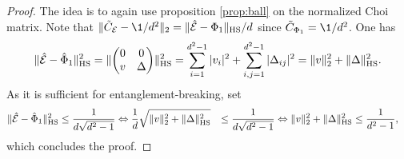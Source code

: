 \begin{proof}
The idea is to again use proposition \ref{prop:ball} on the normalized Choi matrix. Note that $\norm{\tilde C_{\m E} - \1/d^2}_2 = \norm{\hat{\m E}- \Phi_1}_\text{HS}/d$ since $\tilde C_{\Phi_1} = \1/d^2$. One has
\begin{align*}
    \lVert\hat{\mathcal E}- \hat \Phi_1\rVert_\text{HS} ^2 = \lVert\begin{pmatrix}
        0 & 0\\ 
        v & \Delta
    \end{pmatrix}\rVert_\text{HS}^2  = \sum_{i=1}^{d^2-1}|v_i|^2 + \sum_{i,j = 1}^{d^2-1} \vert \Delta_{ij}\vert^2 = \lVert v\rVert_2^2 + \lVert\Delta\rVert_\text{HS}^2.
\end{align*}
As it is sufficient for entanglement-breaking, set 
\begin{align*}
    \lVert\hat{\mathcal E}- \hat \Phi_1\rVert_\text{HS} ^2 &\leq \frac{1}{d\sqrt{d^2-1}}
    \Leftrightarrow \frac{1}{d} \sqrt{\lVert v\rVert_2^2 + \lVert\Delta\rVert_\text{HS}^2} &\leq \frac{1}{d\sqrt{d^2-1}} \Leftrightarrow
    \lVert v\rVert_2^2 + \lVert\Delta\rVert_\text{HS}^2 &\leq \frac{1}{d^2-1},
\end{align*}
which concludes the proof.
\end{proof}

